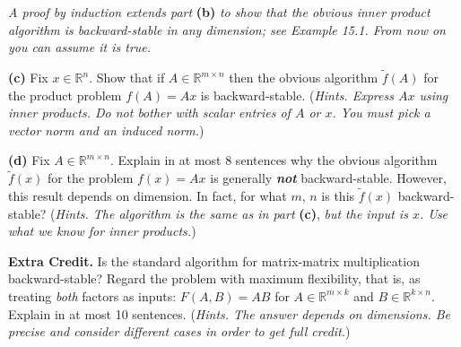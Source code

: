 \documentclass[12pt]{amsart}
\newcommand{\RR}{\mathbb{R}}
\newcommand{\prob}[1]{\bigskip\noindent\textbf{#1.}\quad }
\newcommand{\epart}[1]{\medskip\noindent\textbf{(#1)}\quad }
\begin{document}
\medskip
\noindent \emph{A proof by induction extends part} \textbf{(b)} \emph{to show that the obvious inner product algorithm is backward-stable in any dimension; see Example 15.1.  From now on you can assume it is true.}

\epart{c}  Fix $x\in \RR^n$.   Show that if $A \in \RR^{m \times n}$ then the obvious algorithm $\tilde f(A)$ for the product problem $f(A) = A x$ is backward-stable.  (\emph{Hints.  Express $Ax$ using inner products.  Do not bother with scalar entries of $A$ or $x$.  You must pick a vector norm and an induced norm.})

\epart{d}  Fix $A \in \RR^{m \times n}$.  Explain in at most 8 sentences why the obvious algorithm $\tilde f(x)$ for the problem $f(x) = A x$ is generally \textbf{\emph{not}} backward-stable.  However, this result depends on dimension.  In fact, for what $m$, $n$ is this $\tilde f(x)$ backward-stable?  (\emph{Hints.  The algorithm is the same as in part} \textbf{(c)}, \emph{but the input is $x$.  Use what we know for inner products.})

\prob{Extra Credit}  Is the standard algorithm for matrix-matrix multiplication backward-stable?  Regard the problem with maximum flexibility, that is, as treating \emph{both} factors as inputs: $F(A,B)=AB$ for $A \in \RR^{m \times k}$ and $B \in \RR^{k \times n}$.  Explain in at most 10 sentences.  (\emph{Hints.  The answer depends on dimensions.  Be precise and consider different cases in order to get full credit.})
\end{document}
